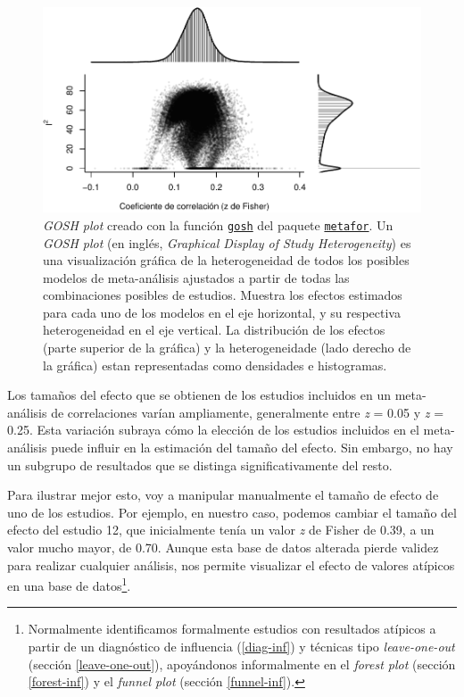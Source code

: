 \documentclass[
  bookmarksnumbered]{article}
\begin{document}
\begin{figure}
\centering
\includegraphics{Meta-analysis_files/figure-latex/gosh1-1.pdf}
\caption{\label{fig:gosh1}\emph{GOSH plot} creado con la función \href{https://www.metafor-project.org/doku.php/plots:gosh_plot}{\texttt{gosh}} del paquete \href{https://www.metafor-project.org/doku.php}{\texttt{metafor}}. Un \emph{GOSH plot} (en inglés, \emph{Graphical Display of Study Heterogeneity}) es una visualización gráfica de la heterogeneidad de todos los posibles modelos de meta-análisis ajustados a partir de todas las combinaciones posibles de estudios. Muestra los efectos estimados para cada uno de los modelos en el eje horizontal, y su respectiva heterogeneidad en el eje vertical. La distribución de los efectos (parte superior de la gráfica) y la heterogeneidade (lado derecho de la gráfica) estan representadas como densidades e histogramas.}
\end{figure}

Los tamaños del efecto que se obtienen de los estudios incluidos en un meta-análisis de correlaciones varían ampliamente, generalmente entre \emph{z} = 0.05 y \emph{z} = 0.25. Esta variación subraya cómo la elección de los estudios incluidos en el meta-análisis puede influir en la estimación del tamaño del efecto. Sin embargo, no hay un subgrupo de resultados que se distinga significativamente del resto.

Para ilustrar mejor esto, voy a manipular manualmente el tamaño de efecto de uno de los estudios. Por ejemplo, en nuestro caso, podemos cambiar el tamaño del efecto del estudio 12, que inicialmente tenía un valor \emph{z} de Fisher de 0.39, a un valor mucho mayor, de 0.70. Aunque esta base de datos alterada pierde validez para realizar cualquier análisis, nos permite visualizar el efecto de valores atípicos en una base de datos\footnote{Normalmente identificamos formalmente estudios con resultados atípicos a partir de un diagnóstico de influencia (\ref{diag-inf}) y técnicas tipo \emph{leave-one-out} (sección \ref{leave-one-out}), apoyándonos informalmente en el \emph{forest plot} (sección \ref{forest-inf}) y el \emph{funnel plot} (sección \ref{funnel-inf}).}.
\end{document}
